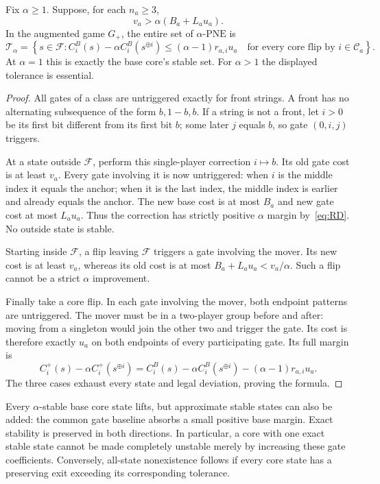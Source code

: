\documentclass[manuscript,review,anonymous]{acmart}
\newcommand{\PNE}{\mathrm{PNE}}
\newcommand{\F}{\mathcal F}
\newcommand{\xor}{\mathbin{\oplus}}
\begin{document}
\begin{theorem}\label{thm:core}
Fix $\alpha\ge1$. Suppose, for each $n_a\ge3$,
\begin{equation}\label{eq:RD}
 v_a>\alpha(B_a+L_au_a).
\end{equation}
In the augmented game $G_+$, the entire set of $\alpha$-$\PNE$ is
\begin{equation}\label{eq:toleranceset}
 \mathcal T_\alpha=\left\{s\in\F:
 C_i^B(s)-\alpha C_i^B(s^{\xor i})
 \le(\alpha-1)r_{a,i}u_a
 \quad\text{for every core flip by }i\in\mathcal C_a\right\}.
\end{equation}
At $\alpha=1$ this is exactly the base core's stable set. For $\alpha>1$ the displayed tolerance is essential.
\end{theorem}
\begin{proof}
All gates of a class are untriggered exactly for front strings. A front has no alternating subsequence of the form $b,1-b,b$. If a string is not a front, let $i>0$ be its first bit different from its first bit $b$; some later $j$ equals $b$, so gate $(0,i,j)$ triggers.

At a state outside $\F$, perform this single-player correction $i\mapsto b$. Its old gate cost is at least $v_a$. Every gate involving it is now untriggered: when $i$ is the middle index it equals the anchor; when it is the last index, the middle index is earlier and already equals the anchor. The new base cost is at most $B_a$ and new gate cost at most $L_au_a$. Thus the correction has strictly positive $\alpha$ margin by~\eqref{eq:RD}. No outside state is stable.

Starting inside $\F$, a flip leaving $\F$ triggers a gate involving the mover. Its new cost is at least $v_a$, whereas its old cost is at most $B_a+L_au_a<v_a/\alpha$. Such a flip cannot be a strict $\alpha$ improvement.

Finally take a core flip. In each gate involving the mover, both endpoint patterns are untriggered. The mover must be in a two-player group before and after: moving from a singleton would join the other two and trigger the gate. Its cost is therefore exactly $u_a$ on both endpoints of every participating gate. Its full margin is
\begin{equation}\label{eq:coremargin}
 C_i^+(s)-\alpha C_i^+(s^{\xor i})
 =C_i^B(s)-\alpha C_i^B(s^{\xor i})-(\alpha-1)r_{a,i}u_a.
\end{equation}
The three cases exhaust every state and legal deviation, proving the formula.
\end{proof}
Every $\alpha$-stable base core state lifts, but approximate stable states can also be added: the common gate baseline absorbs a small positive base margin. Exact stability is preserved in both directions. In particular, a core with one exact stable state cannot be made completely unstable merely by increasing these gate coefficients. Conversely, all-state nonexistence follows if every core state has a preserving exit exceeding its corresponding tolerance.
\end{document}
